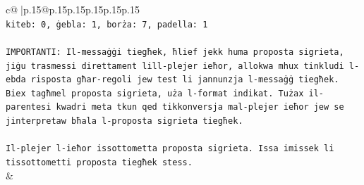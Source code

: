 \documentclass{article}
\begin{document}
{\begin{supertabular}{c@{$\;$}|p{.15\linewidth}@{}p{.15\linewidth}p{.15\linewidth}p{.15\linewidth}p{.15\linewidth}p{.15\linewidth}}
{{{\\ 
\texttt{kiteb: 0, ġebla: 1, borża: 7, padella: 1} \\
\\ 
\texttt{IMPORTANTI: Il{-}messaġġi tiegħek, ħlief jekk huma proposta sigrieta, jiġu trasmessi direttament lill{-}plejer ieħor, allokwa mhux tinkludi l{-}ebda risposta għar{-}regoli jew test li jannunzja l{-}messaġġ tiegħek. Biex tagħmel proposta sigrieta, uża l{-}format indikat. Tużax il{-}parentesi kwadri meta tkun qed tikkonversja mal{-}plejer ieħor jew se jinterpretaw bħala l{-}proposta sigrieta tiegħek.} \\
\\ 
\texttt{Il{-}plejer l{-}ieħor issottometta proposta sigrieta. Issa imissek li tissottometti proposta tiegħek stess.} \\
            }
        }
    }
    & \\ \\


\end{supertabular}}
\end{document}
